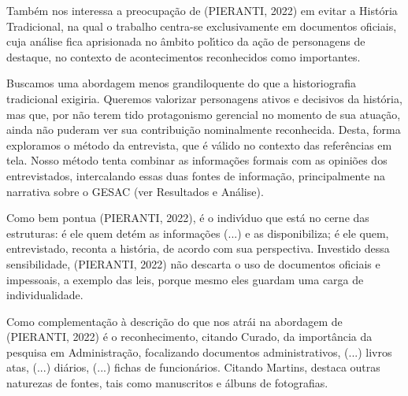\documentclass[
12pt,		%
openright,	%
twoside,  %
a4paper,			%
chapter=TITLE,		%
english,			%
french,				%
spanish,			%
brazil				%
]{USPSC-classe/USPSC}
\begin{document}
Tamb\'em nos interessa a preocupa\c{c}\~ao de (PIERANTI, 2022) em evitar a Hist\'oria Tradicional, na qual o trabalho centra-se exclusivamente em documentos oficiais, cuja an\'alise fica aprisionada no \^ambito pol\'{\i}tico da a\c{c}\~ao de \textquotedbl personagens de destaque\textquotedbl , no contexto de \textquotedbl acontecimentos reconhecidos como importantes\textquotedbl .









Buscamos uma abordagem menos grandiloquente do que a historiografia tradicional exigiria. Queremos valorizar personagens ativos e decisivos da hist\'oria, mas que, por n\~ao terem tido protagonismo gerencial no momento de sua atua\c{c}\~ao, ainda n\~ao puderam ver sua contribui\c{c}\~ao nominalmente reconhecida. Desta, forma exploramos o m\'etodo da entrevista, que \'e v\'alido no contexto das refer\^encias em tela. Nosso m\'etodo tenta combinar as informa\c{c}\~oes formais com as opini\~oes dos entrevistados, intercalando essas duas fontes de informa\c{c}\~ao, principalmente na narrativa sobre o GESAC (ver Resultados e An\'alise).









Como bem pontua (PIERANTI, 2022), \textquotedbl \'e o indiv\'{\i}duo que est\'a no cerne das estruturas: \'e ele quem det\'em as informa\c{c}\~oes (...) e as disponibiliza; \'e ele quem, entrevistado, reconta a hist\'oria, de acordo com sua perspectiva\textquotedbl . Investido dessa sensibilidade,  (PIERANTI, 2022) n\~ao descarta o uso de documentos oficiais e impessoais, a exemplo das leis, porque mesmo eles \textquotedbl guardam uma carga de individualidade\textquotedbl .









Como complementa\c{c}\~ao \`a descri\c{c}\~ao do que nos atr\'ai na abordagem de  (PIERANTI, 2022) \'e o reconhecimento, citando Curado, da import\^ancia da pesquisa em Administra\c{c}\~ao, focalizando \textquotedbl documentos administrativos, (...) livros atas, (...) di\'arios, (...) fichas de funcion\'arios\textquotedbl . Citando Martins, destaca outras naturezas de fontes, tais como manuscritos e \'albuns de fotografias.
\end{document}
